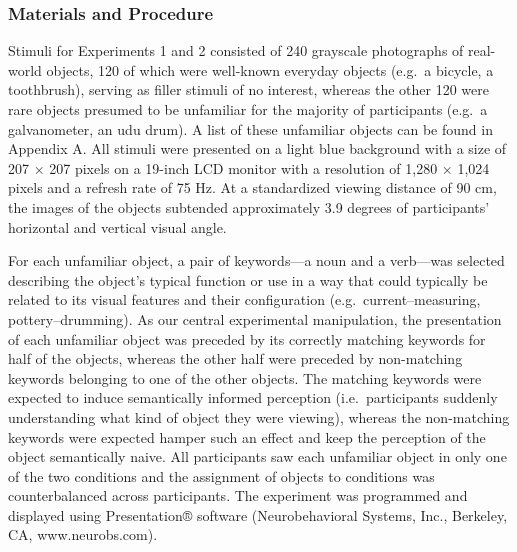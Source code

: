 \documentclass[
  english,
  man,11pt,floatsintext]{apa7}
\begin{document}
\hypertarget{materials-and-procedure}{%
\subsubsection{Materials and Procedure}\label{materials-and-procedure}}

Stimuli for Experiments 1 and 2 consisted of 240 grayscale photographs of real-world objects, 120 of which were well-known everyday objects (e.g.~a bicycle, a toothbrush), serving as filler stimuli of no interest, whereas the other 120 were rare objects presumed to be unfamiliar for the majority of participants (e.g.~a galvanometer, an udu drum). A list of these unfamiliar objects can be found in Appendix A. All stimuli were presented on a light blue background with a size of 207 × 207 pixels on a 19-inch LCD monitor with a resolution of 1,280 × 1,024 pixels and a refresh rate of 75 Hz. At a standardized viewing distance of 90 cm, the images of the objects subtended approximately 3.9 degrees of participants' horizontal and vertical visual angle.

For each unfamiliar object, a pair of keywords---a noun and a verb---was selected describing the object's typical function or use in a way that could typically be related to its visual features and their configuration (e.g.~current--measuring, pottery--drumming). As our central experimental manipulation, the presentation of each unfamiliar object was preceded by its correctly matching keywords for half of the objects, whereas the other half were preceded by non-matching keywords belonging to one of the other objects. The matching keywords were expected to induce semantically informed perception (i.e.~participants suddenly understanding what kind of object they were viewing), whereas the non-matching keywords were expected hamper such an effect and keep the perception of the object semantically naive. All participants saw each unfamiliar object in only one of the two conditions and the assignment of objects to conditions was counterbalanced across participants. The experiment was programmed and displayed using Presentation® software (Neurobehavioral Systems, Inc., Berkeley, CA, www.neurobs.com).
\end{document}
